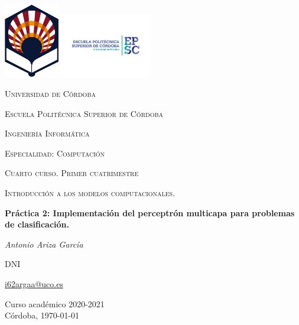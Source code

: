 \begin{titlepage}
\centering
\includegraphics[width=0.18\textwidth]{img/logo_uco_sin_texto.png}
\includegraphics[width=0.30\textwidth]{img/logo_uco_epsc.png}\par\vspace{1cm}
{\scshape\LARGE Universidad de Córdoba\par}
{\scshape\Large Escuela Politécnica Superior de Córdoba\par}
\vspace{1cm}
{\scshape\LARGE Ingeniería Informática\par}
{\scshape\Large Especialidad: Computación\par}
{\scshape\Large Cuarto curso. Primer cuatrimestre\par}
\vspace{1.5cm}
{\scshape\LARGE Introducción a los modelos computacionales.\par}
\vspace{1.5cm}
{\huge\bfseries Práctica 2: Implementación del perceptrón multicapa para problemas de clasificación.\par}
\vspace{1.2cm}
{\Large\itshape Antonio Ariza García\par}
DNI\par
\href{mailto:correo@uco.es}{i62argaa@uco.es}\par
\vfill

{\large Curso académico 2020-2021\\Córdoba, \today\par}
\end{titlepage}